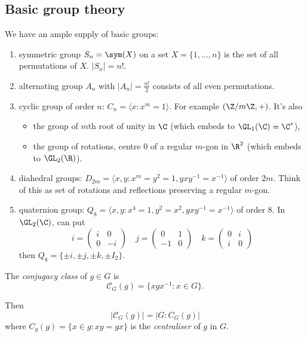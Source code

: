 \documentclass[a4paper]{article}
\newcommand{\ccl}{{\mathcal C}} %
\begin{document}
\subsection{Basic group theory}

We have an ample supply of basic groups:
\begin{enumerate}
\item symmetric group \(S_n = \sym(X)\) on a set \(X = \{1, \dots, n\}\) is the set of all permutations of \(X\). \(|S_n| = n!\).
\item alternating group \(A_n\) with \(|A_n| = \frac{n!}{2}\) consists of all even permutations.
\item cyclic group of order \(n\): \(C_n = \langle x: x^m = 1\rangle\). For example \((\Z/m\Z, +)\). It's also
  \begin{itemize}
  \item the group of \(m\)th root of unity in \(\C\) (which embeds to \(\GL_1(\C) = \C^*\)),
  \item the group of rotations, centre \(0\) of a regular \(m\)-gon in \(\R^2\) (which embeds to \(\GL_2(\R)\)).
  \end{itemize}
\item diahedral groups: \(D_{2m} = \langle x, y: x^m = y^2 = 1, yxy^{-1} = x^{-1} \rangle\) of order \(2m\). Think of this as set of rotations and reflections preserving a regular \(m\)-gon.
\item quaternion group: \(Q_8 = \langle x, y: x^4 = 1, y^2 = x^2, yxy^{-1} = x^{-1} \rangle\) of order \(8\). In \(\GL_2(\C)\), can put
  \[
    i =
    \begin{pmatrix}
      i & 0 \\
      0 & -i
    \end{pmatrix}
    \quad
    j =
    \begin{pmatrix}
      0 & 1 \\
      -1 & 0
    \end{pmatrix}
    \quad
     k =
    \begin{pmatrix}
      0 & i \\
      i & 0
    \end{pmatrix}
  \]
  then \(Q_8 = \{\pm i, \pm j, \pm k, \pm I_2\}\).
\end{enumerate}

\begin{definition}
  The \emph{conjugacy class} of \(g \in G\) is
  \[
    \ccl_G(g) = \{xgx^{-1}: x \in G\}.
  \]

  Then
  \[
    |\ccl_G(g)| = |G: C_G(g)|
  \]
  where \(C_g(g) = \{x \in g: xg = gx\}\) is the \emph{centraliser} of \(g\) in \(G\).
\end{definition}
\end{document}
